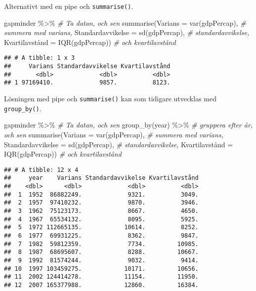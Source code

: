 \documentclass[
]{book}
\newenvironment{Shaded}{\begin{snugshade}}{\end{snugshade}}
\newcommand{\AttributeTok}[1]{\textcolor[rgb]{0.77,0.63,0.00}{#1}}
\newcommand{\CommentTok}[1]{\textcolor[rgb]{0.56,0.35,0.01}{\textit{#1}}}
\newcommand{\FunctionTok}[1]{\textcolor[rgb]{0.00,0.00,0.00}{#1}}
\newcommand{\NormalTok}[1]{#1}
\newcommand{\OtherTok}[1]{\textcolor[rgb]{0.56,0.35,0.01}{#1}}
\newcommand{\SpecialCharTok}[1]{\textcolor[rgb]{0.00,0.00,0.00}{#1}}
\theoremstyle{definition}
\theoremstyle{definition}
\theoremstyle{definition}
\theoremstyle{definition}
\theoremstyle{remark}
\begin{document}
Alternativt med en pipe och \texttt{summarise()}.

\begin{Shaded}
\begin{Highlighting}[]
\NormalTok{gapminder }\SpecialCharTok{\%\textgreater{}\%}                                    \CommentTok{\# Ta datan, och sen}
  \FunctionTok{summarise}\NormalTok{(}\AttributeTok{Varians =} \FunctionTok{var}\NormalTok{(gdpPercap),            }\CommentTok{\# summera med varians,}
            \AttributeTok{Standardavvikelse =} \FunctionTok{sd}\NormalTok{(gdpPercap),   }\CommentTok{\# standardavvikelse,}
\NormalTok{            Kvartilavstånd }\OtherTok{=} \FunctionTok{IQR}\NormalTok{(gdpPercap))     }\CommentTok{\# och kvartilavstånd}
\end{Highlighting}
\end{Shaded}

\begin{verbatim}
## # A tibble: 1 x 3
##     Varians Standardavvikelse Kvartilavstånd
##       <dbl>             <dbl>          <dbl>
## 1 97169410.             9857.          8123.
\end{verbatim}

Lösningen med pipe och \texttt{summarise()} kan som tidigare utvecklas med \texttt{group\_by()}.

\begin{Shaded}
\begin{Highlighting}[]
\NormalTok{gapminder }\SpecialCharTok{\%\textgreater{}\%}                                    \CommentTok{\# Ta datan, och sen}
  \FunctionTok{group\_by}\NormalTok{(year) }\SpecialCharTok{\%\textgreater{}\%}                             \CommentTok{\# gruppera efter år, och sen}
  \FunctionTok{summarise}\NormalTok{(}\AttributeTok{Varians =} \FunctionTok{var}\NormalTok{(gdpPercap),            }\CommentTok{\# summera med varians,}
            \AttributeTok{Standardavvikelse =} \FunctionTok{sd}\NormalTok{(gdpPercap),   }\CommentTok{\# standardavvikelse,}
\NormalTok{            Kvartilavstånd }\OtherTok{=} \FunctionTok{IQR}\NormalTok{(gdpPercap))     }\CommentTok{\# och kvartilavstånd}
\end{Highlighting}
\end{Shaded}

\begin{verbatim}
## # A tibble: 12 x 4
##     year    Varians Standardavvikelse Kvartilavstånd
##    <dbl>      <dbl>             <dbl>          <dbl>
##  1  1952  86882249.             9321.          3049.
##  2  1957  97410232.             9870.          3946.
##  3  1962  75123173.             8667.          4650.
##  4  1967  65534132.             8095.          5925.
##  5  1972 112665135.            10614.          8252.
##  6  1977  69931225.             8362.          9847.
##  7  1982  59812359.             7734.         10985.
##  8  1987  68695607.             8288.         10667.
##  9  1992  81574244.             9032.          9414.
## 10  1997 103459275.            10171.         10656.
## 11  2002 124414278.            11154.         11950.
## 12  2007 165377988.            12860.         16384.
\end{verbatim}
\end{document}
